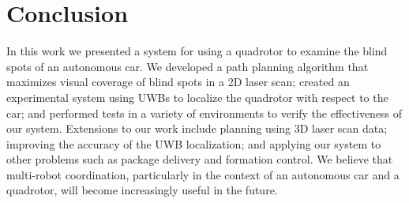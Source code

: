 
\section{Conclusion}

In this work we presented a system for using a quadrotor to examine the blind spots of an autonomous car. We developed a path planning algorithm that maximizes visual coverage of blind spots in a 2D laser scan; created an experimental system using UWBs to localize the quadrotor with respect to the car; and performed tests in a variety of environments to verify the effectiveness of our system. Extensions to our work include planning using 3D laser scan data; improving the accuracy of the UWB localization; and applying our system to other problems such as package delivery and formation control. We believe that multi-robot coordination, particularly in the context of an autonomous car and a quadrotor, will become increasingly useful in the future.
